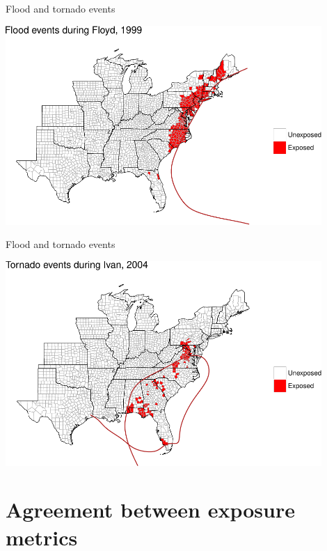 \documentclass[ignorenonframetext,]{beamer}
\begin{document}
\begin{frame}{Flood and tornado events}

\begin{center}\includegraphics[width=0.9\textwidth]{anderson_jan18_files/figure-beamer/floyd_flood_example-1} \end{center}

\end{frame}

\begin{frame}{Flood and tornado events}

\begin{center}\includegraphics[width=0.9\textwidth]{anderson_jan18_files/figure-beamer/ivan_tornado_example-1} \end{center}

\end{frame}

\section{Agreement between exposure
metrics}\label{agreement-between-exposure-metrics}
\end{document}
